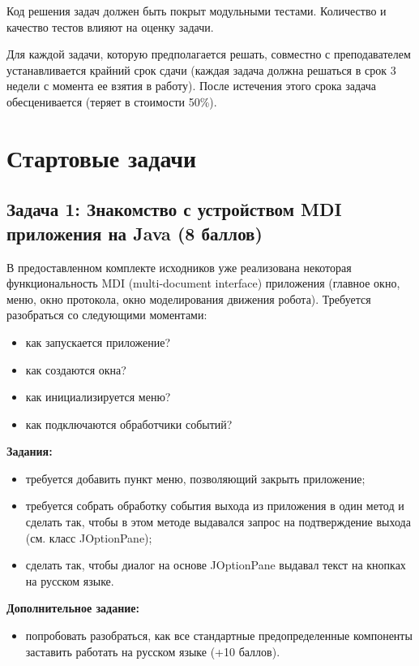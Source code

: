 \documentclass[a4paper,12pt]{article}
\begin{document}
Код решения задач должен быть покрыт модульными тестами. Количество и качество тестов влияют на оценку задачи.

Для каждой задачи, которую предполагается решать, совместно с преподавателем устанавливается крайний срок сдачи (каждая задача должна решаться в срок 3 недели с момента ее взятия в работу). После истечения этого срока задача обесценивается (теряет в стоимости 50\%).

\section{Стартовые задачи}

\subsection{Задача 1: Знакомство с устройством MDI приложения на Java (8 баллов)}

В предоставленном комплекте исходников уже реализована некоторая функциональность MDI (multi-document interface) приложения (главное окно, меню, окно протокола, окно моделирования движения робота). Требуется разобраться со следующими моментами:
\begin{itemize}
    \item как запускается приложение?
    \item как создаются окна?
    \item как инициализируется меню?
    \item как подключаются обработчики событий?
\end{itemize}

\textbf{Задания:}
\begin{itemize}
    \item требуется добавить пункт меню, позволяющий закрыть приложение;
    \item требуется собрать обработку события выхода из приложения в один метод и сделать так, чтобы в этом методе выдавался запрос на подтверждение выхода (см. класс JOptionPane);
    \item сделать так, чтобы диалог на основе JOptionPane выдавал текст на кнопках на русском языке.
\end{itemize}

\textbf{Дополнительное задание:}
\begin{itemize}
    \item попробовать разобраться, как все стандартные предопределенные компоненты заставить работать на русском языке (+10 баллов).
\end{itemize}
\end{document}
